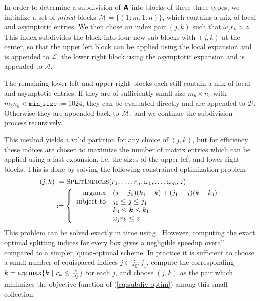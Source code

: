 In order to determine a subdivision of $\bm{\mathsf{A}}$ into blocks of these three
types, we initialize a set of \textit{mixed} blocks $\mathscr{M} = \{(1:m,
1:n)\}$, which contains a mix of local and asymptotic entries. We then chose an
index pair $(j,k)$ such that $\omega_j r_k \approx z$. This index subdivides the
block into four new sub-blocks with $(j,k)$ at the center, so that the upper
left block can be applied using the local expansion and is appended to
$\mathscr{L}$, the lower right block using the asymptotic expansion and is
appended to $\mathscr{A}$. 

The remaining lower left and upper right blocks each still contain a mix of
local and asymptotic entries. If they are of sufficiently small size $m_b \times
n_b$ with $m_b n_b < \texttt{min\_size} := 1024$, they can be evaluated directly
and are appended to $\mathscr{D}$. Otherwise they are appended back to
$\mathscr{M}$, and we continue the subdivision process recursively. 

This method yields a valid partition for any choice of $(j,k)$, but for
efficiency these indices are chosen to maximize the number of matrix entries
which can be applied using a fast expansion, i.e. the sizes of the upper left
and lower right blocks. This is done by solving the following constrained
optimization problem
\begin{align}
    (j,k) 
    &\ = \textsc{SplitIndices}(r_1,\dots,r_n, \omega_1,\dots,\omega_m, z) \\
    &:= \left\{
        \begin{array}{r@{\quad } l}
        \text{argmax} & (j-j_0)(k_1-k) + (j_1-j)(k-k_0)   \\
        \text{subject to} & j_0 \leq j \leq j_1 \\ 
        & k_0 \leq k \leq k_1 \\ 
        & \omega_j r_k \leq z
        \end{array}
    \right. \label{eq:subdiv-optim}
\end{align}
This problem can be solved exactly in  time
using . However, computing the exact optimal splitting indices
for every box gives a negligible speedup overall compared to a simpler,
quasi-optimal scheme. In practice it is sufficient to choose a small number of
equispaced indices $j \in j_0:j_1$, compute the corresponding $k = \operatorname*{arg\,max} \{k \
| \ r_k \leq \frac{z}{\omega_j}\}$ for each $j$, and choose $(j,k)$ as the pair
which minimizes the objective function of (\ref{eq:subdiv-optim}) among this
small collection.

